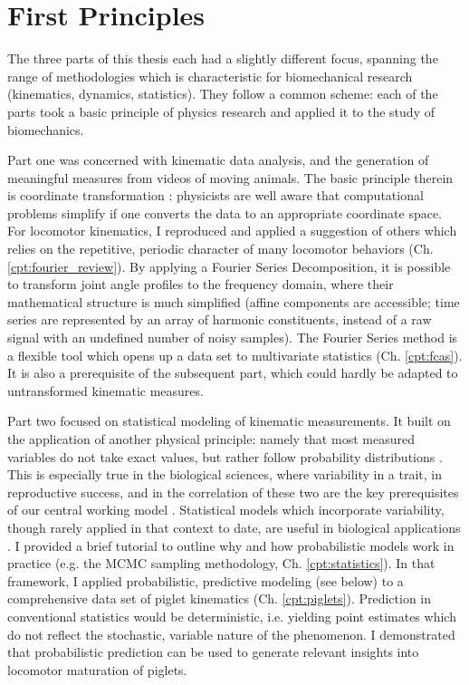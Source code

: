 \section{First Principles}
\label{sec:org24115e0}
The three parts of this thesis each had a slightly different focus, spanning the range of methodologies which is characteristic for biomechanical research (kinematics, dynamics, statistics).
They follow a common scheme:
each of the parts took a basic principle of physics research and applied it to the study of biomechanics.


Part one was concerned with kinematic data analysis, and the generation of meaningful measures from videos of moving animals.
The basic principle therein is coordinate transformation \citep{Tipler2007}: physicists are well aware that computational problems simplify if one converts the data to an appropriate coordinate space.
For locomotor kinematics, I reproduced and applied a suggestion of others \citep{Bernstein1927a,Webb2007} which relies on the repetitive, periodic character of many locomotor behaviors (Ch. \ref{cpt:fourier_review}).
By applying a Fourier Series Decomposition, it is possible to transform joint angle profiles to the frequency domain, where their mathematical structure is much simplified (affine components are accessible; time series are represented by an array of harmonic constituents, instead of a raw signal with an undefined number of noisy samples).
The Fourier Series method is a flexible tool which opens up a data set to multivariate statistics (Ch. \ref{cpt:fcas}).
It is also a prerequisite of the subsequent part, which could hardly be adapted to untransformed kinematic measures.

\medskip
Part two focused on statistical modeling of kinematic measurements.
It built on the application of another physical principle: namely that most measured variables do not take exact values, but rather follow probability distributions \citep{2022Probability}.
This is especially true in the biological sciences, where variability in a trait, in reproductive success, and in the correlation of these two are the key prerequisites of our central working model \citep{Darwin1859}.
Statistical models which incorporate variability, though rarely applied in that context to date, are useful in biological applications \citep{Roraas2019,DeGroote2021}.
I provided a brief tutorial to outline why and how probabilistic models work in practice (e.g. the MCMC sampling methodology, Ch. \ref{cpt:statistics}).
In that framework, I applied probabilistic, predictive modeling (see below) to a comprehensive data set of piglet kinematics (Ch. \ref{cpt:piglets}).
Prediction in conventional statistics would be deterministic, i.e. yielding point estimates which do not reflect the stochastic, variable nature of the phenomenon.
I demonstrated that probabilistic prediction can be used to generate relevant insights into locomotor maturation of piglets.

